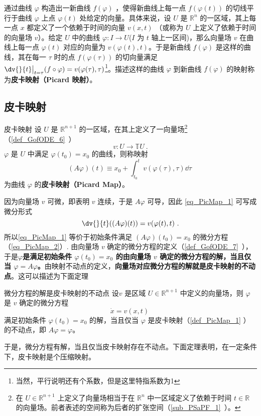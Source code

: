 
\cite{Arnold}通过曲线 $\varphi$ 构造出一新曲线 $f(\varphi)$ ，使得新曲线上每一点 $f(\varphi(t))$ 的切线平行于曲线 $\varphi$ 上点 $\varphi(t)$ 处给定的向量。具体来说，设 $U$ 是 $\mathbb R^n$ 的一区域，其上每一点 $x$ 都定义了一个依赖于时间的向量 $v(x,t)$ （或称为 $U$ 上定义了依赖于时间的向量场 $v$）。给定 $U$ 中的曲线 $\varphi:I\rightarrow U$($I$ 为 $t$ 轴上一区间)，那么向量场 $v$ 在曲线上每一点 $\varphi(t)$ 对应的向量为 $v(\varphi(t),t)$。于是新曲线 $f(\varphi)$ 是这样的曲线，其在每一 $\tau$ 时的点 $f(\varphi(\tau))$ 的切向量满足 $\dv{}{t}\big|_{t=\tau}(f\circ \varphi)=v(\varphi(\tau),\tau)$\footnote{当然，平行说明还有个系数，但是这里特指系数为1}。描述这样的曲线 $\varphi$ 到新曲线 $f(\varphi)$ 的映射称为\textbf{皮卡映射（Picard 映射）}。
\subsection{皮卡映射}
\begin{definition}{皮卡映射}\label{def_PicMap_1}
设 $U$ 是 $\mathbb R^{n+1}$ 的一区域，在其上定义了一向量场\footnote{在 $U\in\mathbb R^{n+1}$ 上定义了向量场相当于在 $\mathbb R^n$ 中一区域定义了依赖于时间 $t\in\mathbb R$ 的向量场。前者表述的空间称为后者的扩张空间（\autoref{sub_PSaPF_1}~）。}（\autoref{def_GofODE_6}~） 
\begin{equation}
v:U\rightarrow\mathbb TU~.
\end{equation}
$\varphi$ 是 $U$ 中满足 $\varphi(t_0)=x_0$ 的曲线，则称映射
\begin{equation}\label{eq_PicMap_1}
(A\varphi)(t)\equiv x_0+\int_{t_0}^{t}v(\varphi(\tau),\tau)\dd \tau~
\end{equation}
为曲线 $\varphi$ 的\textbf{皮卡映射（Picard Map）}。
\end{definition}

因为向量场 $v$ 可微，即表明 $v$ 连续，于是 $A\varphi$ 可导，因此 \autoref{eq_PicMap_1} 可写成微分形式
\begin{equation}\label{eq_PicMap_2}
\dv{}{t}((A\varphi)(t))=v(\varphi(t),t)~.
\end{equation}
所以\autoref{eq_PicMap_1} 等价于初始条件满足 $(A\varphi)(t_0)=x_0$ 的微分方程（\autoref{eq_PicMap_2}）. 由向量场 $v$ 确定的微分方程的定义（\autoref{def_GofODE_7}~），于是\textbf{$\varphi$是满足初始条件 $\varphi(t_0)=x_0$ 的由向量场 $v$ 确定的微分方程的解，当且仅当 $\varphi=A\varphi$。}由映射不动点的定义，\textbf{向量场对应微分方程的解就是皮卡映射的不动点}。这可以描述为下面定理
\begin{theorem}{微分方程的解是皮卡映射的不动点}\label{the_PicMap_1}
设$v$ 是区域 $U\in\mathbb R^{n+1}$ 中定义的向量场，则 $\varphi$ 是 $v$ 确定的微分方程
\begin{equation}\label{eq_PicMap_3}
\dot x=v(x,t)~
\end{equation}
满足初始条件 $\varphi(t_0)=x_0$ 的解，当且仅当 $\varphi$ 是皮卡映射（\autoref{def_PicMap_1} ）的不动点，即 $A\varphi=\varphi$。
\end{theorem}
于是，微分方程有解，当且仅当皮卡映射存在不动点。下面定理表明，在一定条件下，皮卡映射是个压缩映射。

